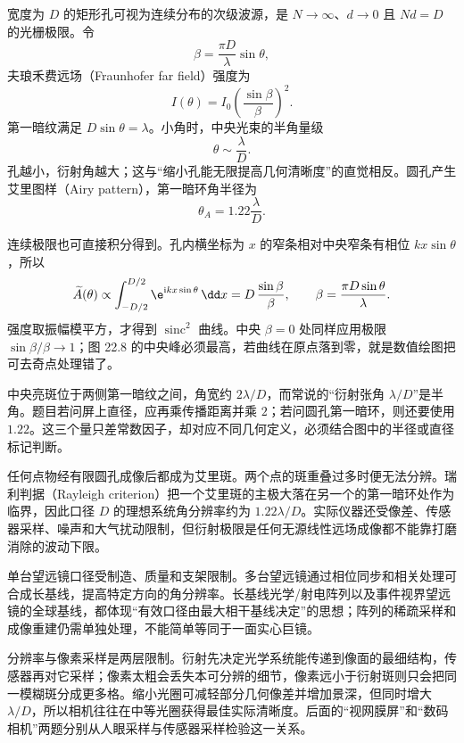 宽度为 $D$ 的矩形孔可视为连续分布的次级波源，是 $N\to\infty$、$d\to0$ 且 $Nd=D$ 的光栅极限。令
\[
 \beta=\frac{\pi D}{\lambda}\sin\theta,
\]
夫琅禾费远场（Fraunhofer far field）强度为
\begin{equation}
 I(\theta)=I_0\left(\frac{\sin\beta}{\beta}\right)^2.
\end{equation}
第一暗纹满足 $D\sin\theta=\lambda$。小角时，中央光束的半角量级
\begin{equation}
 \theta\sim\frac{\lambda}{D}.
\end{equation}
孔越小，衍射角越大；这与“缩小孔能无限提高几何清晰度”的直觉相反。圆孔产生艾里图样（Airy pattern），第一暗环角半径为
\begin{equation}
 \theta_A=1.22\frac{\lambda}{D}.
\end{equation}

连续极限也可直接积分得到。孔内横坐标为 $x$ 的窄条相对中央窄条有相位 $kx\sin\theta$，所以
\[
 \widetilde A(\theta)\propto
 \int_{-D/2}^{D/2}\e^{\mathrm ikx\sin\theta}\,\dd x
 =D\,\frac{\sin\beta}{\beta},
 \qquad \beta=\frac{\pi D\sin\theta}{\lambda}.
\]
强度取振幅模平方，才得到 $\operatorname{sinc}^2$ 曲线。中央 $\beta=0$ 处同样应用极限 $\sin\beta/\beta\to1$；图 22.8 的中央峰必须最高，若曲线在原点落到零，就是数值绘图把可去奇点处理错了。

中央亮斑位于两侧第一暗纹之间，角宽约 $2\lambda/D$，而常说的“衍射张角 $\lambda/D$”是半角。题目若问屏上直径，应再乘传播距离并乘 $2$；若问圆孔第一暗环，则还要使用 $1.22$。这三个量只差常数因子，却对应不同几何定义，必须结合图中的半径或直径标记判断。

\SingleSlitCurve

任何点物经有限圆孔成像后都成为艾里斑。两个点的斑重叠过多时便无法分辨。瑞利判据（Rayleigh criterion）把一个艾里斑的主极大落在另一个的第一暗环处作为临界，因此口径 $D$ 的理想系统角分辨率约为 $1.22\lambda/D$。实际仪器还受像差、传感器采样、噪声和大气扰动限制，但衍射极限是任何无源线性远场成像都不能靠打磨消除的波动下限。

\ResolutionPanel

单台望远镜口径受制造、质量和支架限制。多台望远镜通过相位同步和相关处理可合成长基线，提高特定方向的角分辨率。长基线光学/射电阵列以及事件视界望远镜的全球基线，都体现“有效口径由最大相干基线决定”的思想；阵列的稀疏采样和成像重建仍需单独处理，不能简单等同于一面实心巨镜。

分辨率与像素采样是两层限制。衍射先决定光学系统能传递到像面的最细结构，传感器再对它采样；像素太粗会丢失本可分辨的细节，像素远小于衍射斑则只会把同一模糊斑分成更多格。缩小光圈可减轻部分几何像差并增加景深，但同时增大 $\lambda/D$，所以相机往往在中等光圈获得最佳实际清晰度。后面的“视网膜屏”和“数码相机”两题分别从人眼采样与传感器采样检验这一关系。

